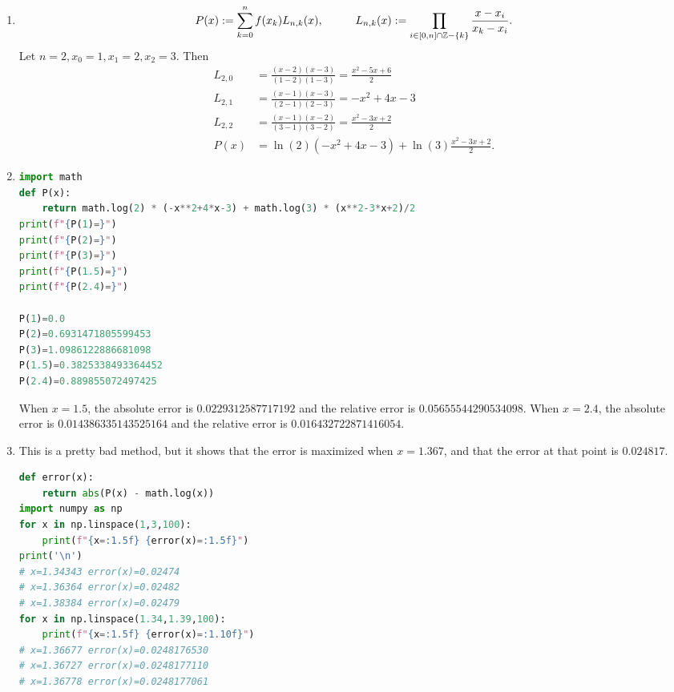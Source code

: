 \documentclass{article}
\begin{document}
\bigskip
\begin{prob}
\end{prob}
\begin{enumerate}[label=(\alph*)]
    \item
\[ P(x) := \sum_{k=0}^n f(x_k)L_{n,k}(x), \hspace{1cm} L_{n,k}(x) := \prod_{i \in [0,n]\cap \mathbb{Z} - \{k\}} \frac{x-x_i}{x_k-x_i}. \]
Let $n=2, x_0=1, x_1=2, x_2=3$. Then
\begin{align*}
    L_{2,0} &= \frac{(x-2)(x-3)}{(1-2)(1-3)} = \frac{x^2-5x+6}{2}\\
    L_{2,1} &= \frac{(x-1)(x-3)}{(2-1)(2-3)} = -x^2+4x-3 \\
    L_{2,2} &= \frac{(x-1)(x-2)}{(3-1)(3-2)} = \frac{x^2-3x+2}{2} \\
    P(x) &= \ln (2) (-x^2+4x-3) + \ln (3) \frac{x^2-3x+2}{2}.
\end{align*}
    \item
\begin{lstlisting}[language=Python]
import math
def P(x):
    return math.log(2) * (-x**2+4*x-3) + math.log(3) * (x**2-3*x+2)/2
print(f"{P(1)=}")
print(f"{P(2)=}")
print(f"{P(3)=}")
print(f"{P(1.5)=}")
print(f"{P(2.4)=}")

P(1)=0.0
P(2)=0.6931471805599453
P(3)=1.0986122886681098
P(1.5)=0.3825338493364452
P(2.4)=0.889855072497425
\end{lstlisting}
When $x=1.5$, the absolute error is $0.0229312587717192$ and the relative error is $0.05655544290534098$. When $x=2.4$, the absolute error is $0.014386335143525164$ and the relative error is $0.016432722871416054$.
    \item This is a pretty bad method, but it shows that the error is maximized when $x=1.367$, and that the error at that point is $0.024817$.
\begin{lstlisting}[language=Python]
def error(x):
    return abs(P(x) - math.log(x))
import numpy as np
for x in np.linspace(1,3,100):
    print(f"{x=:1.5f} {error(x)=:1.5f}")
print('\n')
# x=1.34343 error(x)=0.02474
# x=1.36364 error(x)=0.02482
# x=1.38384 error(x)=0.02479
for x in np.linspace(1.34,1.39,100):
    print(f"{x=:1.5f} {error(x)=:1.10f}")
# x=1.36677 error(x)=0.0248176530
# x=1.36727 error(x)=0.0248177110
# x=1.36778 error(x)=0.0248177061
\end{lstlisting}
\end{enumerate}

\bigskip
\begin{prob}
\end{prob}
\end{document}
